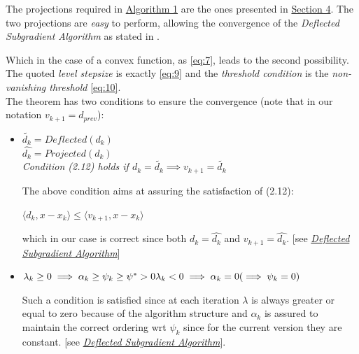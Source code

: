 \documentclass[12pt]{article}
\begin{document}
	\pagebreak
	The projections required in \hyperref[algo:1]{Algorithm 1} are the ones presented in \hyperref[projections]{Section 4}. The two projections are \textit{easy} to perform, allowing the convergence of the \textit{Deflected Subgradient Algorithm} as stated in \parencite[see][Theorem 3.6]{deflectconv}.
	Which in the case of a convex function, as \eqref{eq:7}, leads to the second possibility.
	The quoted \textit{level stepsize} is exactly \eqref{eq:9} and the \textit{threshold condition} is the \textit{non-vanishing threshold} \eqref{eq:10}.\\
	The theorem has two conditions to ensure the convergence (note that in our notation $v_{k+1} = d_{prev}$):
	\begin{itemize}
	    \item \parencite[Cond 2.13]{deflectconv} 
	    \begin{displayquote}
    	    \textit{
    	    $\tilde{d_k} = Deflected(d_k)$\\
    	    $\hat{d_k} = Projected(d_k)$\\
    	    Condition (2.12) holds if \qquad $d_k = \tilde{d_k} \implies v_{k+1} = \tilde{d_k}$}
        \end{displayquote}
        The above condition aims at assuring the satisfaction of (2.12):
        \begin{displayquote}
            $\langle d_k, x - x_k \rangle \leq \langle v_{k+1}, x - x_k \rangle$
        \end{displayquote}
        which in our case is correct since both $d_k = \hat{d_k}$ and $v_{k+1} = \hat{d_k}$.  
        [see \hyperref[algo:1]{\textit{Deflected Subgradient Algorithm}}]
	    \item \parencite[Cond 3.5]{deflectconv} 
	    \begin{displayquote}
            $\lambda_k \geq 0 \implies \alpha_k \geq \psi_k \geq \psi^* > 0 \\
            \lambda_k < 0 \implies \alpha_k = 0 (\implies \psi_k = 0)$
        \end{displayquote}
        Such a condition is satisfied since at each iteration $\lambda$ is always greater or equal to zero because of the algorithm structure and $\alpha_k$ is assured to maintain the correct ordering wrt $\psi_k$ since for the current version they are constant. [see \hyperref[algo:1]{\textit{Deflected Subgradient Algorithm}}].
	\end{itemize}
\end{document}
